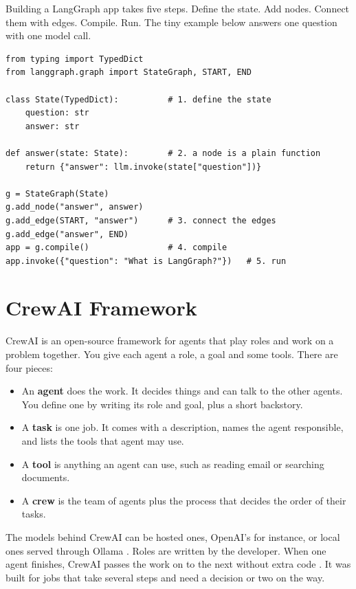 \documentclass[12pt,a4paper]{report}
\begin{document}
Building a LangGraph app takes five steps. Define the state. Add nodes. Connect them with edges. Compile. Run. The tiny example below answers one question with one model call.

\begin{lstlisting}
from typing import TypedDict
from langgraph.graph import StateGraph, START, END

class State(TypedDict):          # 1. define the state
    question: str
    answer: str

def answer(state: State):        # 2. a node is a plain function
    return {"answer": llm.invoke(state["question"])}

g = StateGraph(State)
g.add_node("answer", answer)
g.add_edge(START, "answer")      # 3. connect the edges
g.add_edge("answer", END)
app = g.compile()                # 4. compile
app.invoke({"question": "What is LangGraph?"})   # 5. run
\end{lstlisting}

\section{CrewAI Framework}

CrewAI \cite{crewaidocs} is an open-source framework for agents that play roles and work on a problem together. You give each agent a role, a goal and some tools. There are four pieces:

\begin{itemize}
    \item An \textbf{agent} does the work. It decides things and can talk to the other agents. You define one by writing its role and goal, plus a short backstory.
    \item A \textbf{task} is one job. It comes with a description, names the agent responsible, and lists the tools that agent may use.
    \item A \textbf{tool} is anything an agent can use, such as reading email or searching documents.
    \item A \textbf{crew} is the team of agents plus the process that decides the order of their tasks.
\end{itemize}

The models behind CrewAI can be hosted ones, OpenAI's for instance, or local ones served through Ollama \cite{ollamadocs}. Roles are written by the developer. When one agent finishes, CrewAI passes the work on to the next without extra code \cite{crewaidocs}. It was built for jobs that take several steps and need a decision or two on the way.
\end{document}
